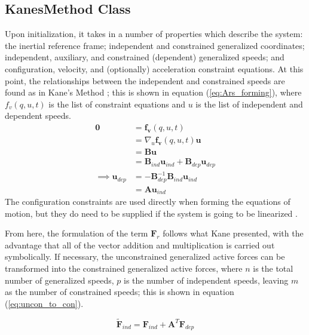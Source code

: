 \documentclass[twocolumn,10pt,final]{asme2e}
\begin{document}
\subsection*{KanesMethod Class}
Upon initialization, it takes in a number of properties which describe the
system: the inertial reference frame; independent and constrained generalized
coordinates; independent, auxiliary, and constrained (dependent) generalized
speeds; and configuration, velocity, and (optionally) acceleration constraint
equations. At this point, the relationships between the independent and
constrained speeds are found as in Kane's Method \cite{Kane1985}; this is shown
in equation (\ref{eq:Ars_forming}), where $f_v(q, u, t)$ is the list of
constraint equations and $u$ is the list of independent and dependent speeds.
\begin{align}
\mathbf{0} &= \mathbf{f_v}(q, u, t) \\
           &= \nabla_u \mathbf{f_v}(q, u, t) \mathbf{u} \\
           &= \mathbf{B} \mathbf{u} \\
           &= \mathbf{B}_{ind} \mathbf{u}_{ind} + \mathbf{B}_{dep}
\mathbf{u}_{dep} \\
\implies \mathbf{u}_{dep} &= - \mathbf{B}_{dep}^{-1} \mathbf{B}_{ind} \mathbf{u}_{ind} \\
                 &= \mathbf{A} \mathbf{u}_{ind}
\label{eq:Ars_forming}
\end{align}
The configuration constraints are used directly when forming the equations of
motion, but they do need to be supplied if the system is going to be linearized
\cite{Peterson2013}.

From here, the formulation of the term $\mathbf{F}_r$ follows what Kane
presented, with the advantage that all of the vector addition and
multiplication is carried out symbolically.  If necessary, the unconstrained
generalized active forces can be transformed into the constrained generalized
active forces, where $n$ is the total number of generalized speeds, $p$ is the
number of independent speeds, leaving $m$ as the number of constrained speeds;
this is shown in equation (\ref{eq:uncon_to_con}).

\begin{equation}
\label{eq:uncon_to_con}
\tilde{\mathbf{F}}_{ind} = \mathbf{F}_{ind} + \mathbf{A}^{T}
\mathbf{F}_{dep}
\end{equation}
\end{document}
